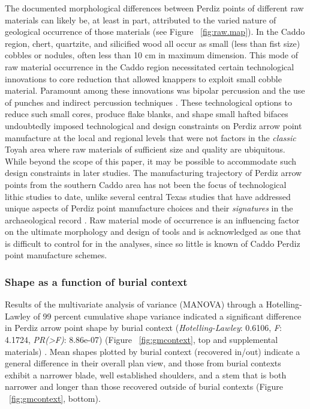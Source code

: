 \documentclass[review]{elsarticle}
\begin{document}
\newpage
The documented morphological differences between Perdiz points of different raw materials can likely be, at least in part, attributed to the varied nature of geological occurrence of those materials (see Figure ~\ref{fig:raw.map}). In the Caddo region, chert, quartzite, and silicified wood all occur as small (less than fist size) cobbles or nodules, often less than 10 cm in maximum dimension. This mode of raw material occurrence in the Caddo region necessitated certain technological innovations to core reduction that allowed knappers to exploit small cobble material. Paramount among these innovations was bipolar percussion and the use of punches and indirect percussion techniques \citep{RN8995,RN8996,RN8997,RN8998,RN2145}. These technological options to reduce such small cores, produce flake blanks, and shape small hafted bifaces undoubtedly imposed technological and design constraints on Perdiz arrow point manufacture at the local and regional levels that were not factors in the \textit{classic} Toyah area where raw materials of sufficient size and quality are ubiquitous. While beyond the scope of this paper, it may be possible to accommodate such design constraints in later studies. The manufacturing trajectory of Perdiz arrow points from the southern Caddo area has not been the focus of technological lithic studies to date, unlike several central Texas studies that have addressed unique aspects of Perdiz point manufacture choices and their \textit{signatures} in the archaeological record \citep{RN8999,RN9000}. Raw material mode of occurrence is an influencing factor on the ultimate morphology and design of tools and is acknowledged as one that is difficult to control for in the analyses, since so little is known of Caddo Perdiz point manufacture schemes.

\subsubsection*{Shape as a function of burial context}

Results of the multivariate analysis of variance (MANOVA) through a Hotelling-Lawley of 99 percent cumulative shape variance indicated a significant difference in Perdiz arrow point shape by burial context (\textit{Hotelling-Lawley}: 0.6106, \textit{F}: 4.1724, \textit{PR(>F)}: 8.86e-07) (Figure ~\ref{fig:gmcontext}, top and supplemental materials) \citep[Chapter 4]{RN8980}. Mean shapes plotted by burial context (recovered in/out) indicate a general difference in their overall plan view, and those from burial contexts exhibit a narrower blade, well established shoulders, and a stem that is both narrower and longer than those recovered outside of burial contexts (Figure ~\ref{fig:gmcontext}, bottom).
\end{document}

